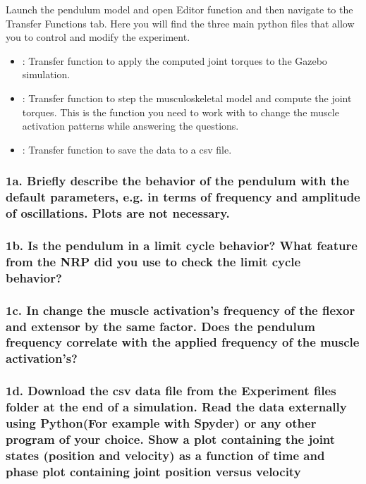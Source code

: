 \documentclass{cmc}
\begin{document}
{        Launch the pendulum model and open Editor function and then
        navigate to the Transfer Functions tab. Here you will find the
        three main python files that allow you to control and modify
        the experiment.
        \begin{itemize}
        \item \textbf{} : Transfer function to
          apply the computed joint torques to the Gazebo simulation.
        \item \textbf{} : Transfer
          function to step the musculoskeletal model and compute the
          joint torques.  This is the function you need to work with
          to change the muscle activation patterns while answering the
          questions.
        \item \textbf{} : Transfer
          function to save the data to a csv file.
        \end{itemize}
        
        \subsubsection*{1a. Briefly describe the behavior of the
          pendulum with the default parameters, e.g. in terms of
          frequency and amplitude of oscillations.  Plots are not
          necessary.}
        \label{sec:1a}

        \subsubsection*{1b. Is the pendulum in a limit cycle behavior?
          What feature from the NRP did you use to check the limit
          cycle behavior?}

        \subsubsection*{1c. In 
          change the muscle activation's frequency of the flexor and
          extensor by the same factor. Does the pendulum frequency
          correlate with the applied frequency of the muscle
          activation's?}
        \label{sec:1c}

        \subsubsection*{1d. Download the csv data file from the
          Experiment files folder at the end of a simulation. Read the
          data externally using Python(For example with Spyder) or any
          other program of your choice. Show a plot containing the
          joint states (position and velocity) as a function of time
          and phase plot containing joint position versus velocity}
        \label{sec:1d}

}
\end{document}
